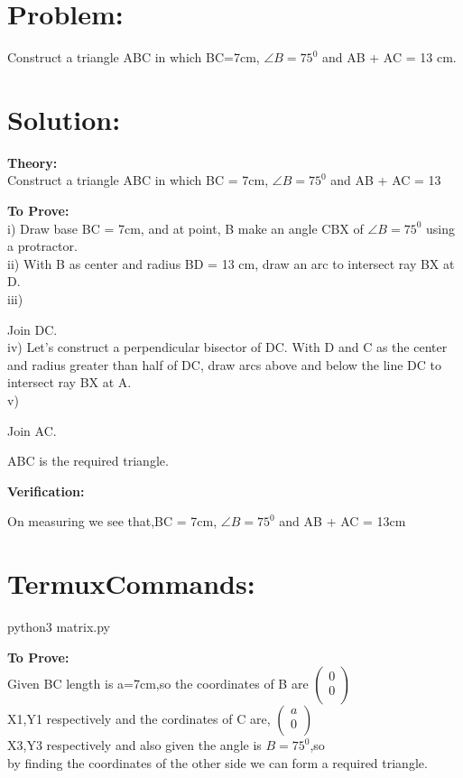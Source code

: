\documentclass[10pt,a4paper]{report}
\begin{document}
\begin{multicols}{2}

\section{Problem:}  Construct a triangle ABC in which BC=7cm, $\angle{B}=75^0$ and AB + AC = 13 cm.\vspace{3mm}
 \section{Solution: }
\raggedright \textbf{Theory:}\\
\centering Construct a triangle ABC in which BC = 7cm, $\angle{B}=75^0$ and AB + AC = 13 \\

\raggedright \textbf{To Prove:}\\
i) Draw base BC = 7cm, and at point, B make an angle CBX of $\angle{B}=75^0$ using \centering a protractor. \\ 
ii) With B as center and radius BD = 13 cm, draw an arc to intersect ray BX at D. \\
iii) \raggedright Join DC. \\
iv) Let's construct a perpendicular bisector of DC. With D and C as the center \centering and radius greater than half of DC, draw arcs above and below the line DC to intersect ray BX at A. \\
v) \raggedright Join AC. 

\centering ABC is the required triangle. 

\raggedright\textbf{Verification:} 

On measuring we see that,BC = 7cm, $\angle{B}=75^0$ and  AB + AC = 13cm  \\
   \section{TermuxCommands: } 
               \centering python3 matrix.py

\raggedright \textbf{To Prove:}\\
   Given BC length is a=7cm,so the coordinates of B are 
 $\begin{pmatrix}
  0\\
  0 \\
 \end{pmatrix}$%
 \\ X1,Y1 respectively and the cordinates of C are,
 $\begin{pmatrix}
  a\\
  0 \\
 \end{pmatrix}$%
 \\ X3,Y3 respectively and also given the angle is $B=75^0$,so \\ by finding the coordinates of the other side we can form a required triangle. \\


\end{multicols}
\end{document}
